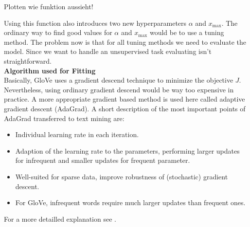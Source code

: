 {\Huge Plotten wie funktion aussieht!}

Using this function also introduces two new hyperparameters $\alpha$ and 
$x_\mathrm{max}$. The ordinary way to find good values for $\alpha$ and 
$x_\mathrm{max}$ would be to use a tuning method. The problem now is that 
for all tuning methods we need to evaluate the model. Since we want to handle an
unsupervised task evaluating isn't straightforward. \\

\textbf{Algorithm used for Fitting} \\

Basically, GloVe uses a gradient descend technique to minimize the objective 
$J$. Nevertheless, using ordinary gradient descend would be way too expensive
in practice. A more appropriate gradient based method is used here called adaptive 
gradient descent (AdaGrad). A short description of the most important points of 
AdaGrad transferred to text mining are:

\begin{itemize}
  \item
    Individual learning rate in each iteration.

  \item 
    Adaption of the learning rate to the parameters, performing larger updates 
    for infrequent and smaller updates for frequent parameter.

  \item 
    Well-suited for sparse data, improve robustness of (stochastic) gradient 
    descent.
  
  \item 
    For GloVe, infrequent words require much larger updates than frequent ones.
\end{itemize}

For a more detailled explanation see \cite{ruder2016overview}.
